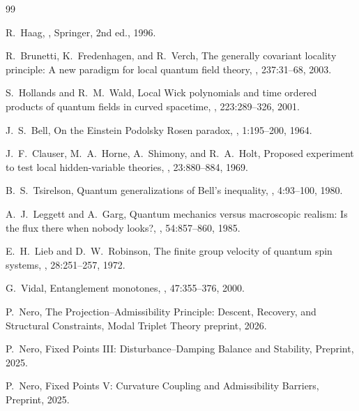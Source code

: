 \documentclass[11pt]{article}
\begin{document}
\begin{thebibliography}{99}

R.~Haag,
,
\newblock Springer, 2nd ed., 1996.

R.~Brunetti, K.~Fredenhagen, and R.~Verch,
\newblock The generally covariant locality principle: A new paradigm for local quantum field theory,
, 237:31--68, 2003.

S.~Hollands and R.~M.~Wald,
\newblock Local Wick polynomials and time ordered products of quantum fields in curved spacetime,
, 223:289--326, 2001.

J.~S.~Bell,
\newblock On the Einstein Podolsky Rosen paradox,
, 1:195--200, 1964.

J.~F.~Clauser, M.~A.~Horne, A.~Shimony, and R.~A.~Holt,
\newblock Proposed experiment to test local hidden-variable theories,
, 23:880--884, 1969.

B.~S.~Tsirelson,
\newblock Quantum generalizations of Bell's inequality,
, 4:93--100, 1980.

A.~J.~Leggett and A.~Garg,
\newblock Quantum mechanics versus macroscopic realism: Is the flux there when nobody looks?,
, 54:857--860, 1985.

E.~H.~Lieb and D.~W.~Robinson,
\newblock The finite group velocity of quantum spin systems,
, 28:251--257, 1972.

G.~Vidal,
\newblock Entanglement monotones,
, 47:355--376, 2000.


P.~Nero,
\newblock The Projection--Admissibility Principle: Descent, Recovery, and
Structural Constraints,
\newblock Modal Triplet Theory preprint, 2026.

P.~Nero,
\newblock Fixed Points III: Disturbance--Damping Balance and Stability,
\newblock Preprint, 2025.

P.~Nero,
\newblock Fixed Points V: Curvature Coupling and Admissibility Barriers,
\newblock Preprint, 2025.


\end{thebibliography}
\end{document}

